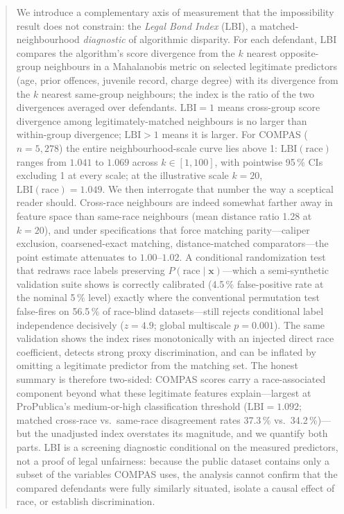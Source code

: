 \documentclass[11pt]{article}
\begin{document}
\begin{abstract}
We introduce a complementary axis of measurement that the impossibility
result does not constrain: the \emph{Legal Bond Index} (LBI), a
matched-neighbourhood \emph{diagnostic} of algorithmic disparity. For
each defendant, LBI compares the algorithm's score divergence from the
$k$ nearest opposite-group neighbours in a Mahalanobis metric on
selected legitimate predictors (age, prior offences, juvenile record,
charge degree) with its divergence from the $k$ nearest same-group
neighbours; the index is the ratio of the two divergences averaged over
defendants. $\mathrm{LBI} = 1$ means cross-group score divergence among
legitimately-matched neighbours is no larger than within-group
divergence; $\mathrm{LBI} > 1$ means it is larger. For COMPAS
($n = 5{,}278$) the entire neighbourhood-scale curve lies above 1:
$\mathrm{LBI}(\text{race})$ ranges from $1.041$ to $1.069$ across
$k \in [1, 100]$, with pointwise 95\,\% CIs excluding 1 at every
scale; at the illustrative scale $k = 20$,
$\mathrm{LBI}(\text{race}) = 1.049$. We then interrogate that number
the way a sceptical reader should. Cross-race neighbours are indeed
somewhat farther away in feature space than same-race neighbours
(mean distance ratio 1.28 at $k = 20$), and under specifications that
force matching parity---caliper exclusion, coarsened-exact matching,
distance-matched comparators---the point estimate attenuates to
$1.00$--$1.02$. A conditional randomization test that redraws race
labels preserving $P(\text{race} \mid \mathbf{x})$---which a
semi-synthetic validation suite shows is correctly calibrated
(4.5\,\% false-positive rate at the nominal 5\,\% level) exactly where
the conventional permutation test false-fires on 56.5\,\% of race-blind
datasets---still rejects conditional label independence decisively
($z = 4.9$; global multiscale $p = 0.001$). The same validation shows
the index rises monotonically with an injected direct race
coefficient, detects strong proxy discrimination, and can be inflated
by omitting a legitimate predictor from the matching set. The honest
summary is therefore two-sided: COMPAS scores carry a race-associated
component beyond what these legitimate features explain---largest at
ProPublica's medium-or-high classification threshold
($\mathrm{LBI} = 1.092$; matched cross-race vs.\ same-race
disagreement rates 37.3\,\% vs.\ 34.2\,\%)---but the unadjusted index
overstates its magnitude, and we quantify both parts. LBI is a
screening diagnostic conditional on the measured predictors, not a
proof of legal unfairness: because the public dataset contains only
a subset of the variables COMPAS uses, the analysis cannot confirm
that the compared defendants were fully similarly situated, isolate
a causal effect of race, or establish discrimination.


\end{abstract}
\end{document}
